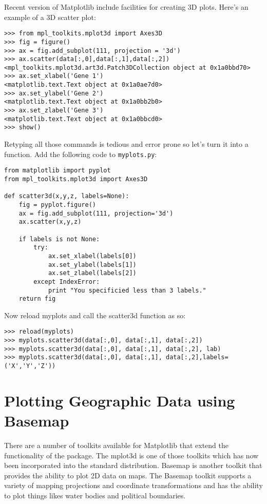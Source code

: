 Recent version of Matplotlib include facilities for creating 3D plots.
Here's an example of a 3D scatter plot:

\begin{lstlisting}
>>> from mpl_toolkits.mplot3d import Axes3D
>>> fig = figure()
>>> ax = fig.add_subplot(111, projection = '3d')
>>> ax.scatter(data[:,0],data[:,1],data[:,2])
<mpl_toolkits.mplot3d.art3d.Patch3DCollection object at 0x1a0bbd70>
>>> ax.set_xlabel('Gene 1')
<matplotlib.text.Text object at 0x1a0ae7d0>
>>> ax.set_ylabel('Gene 2')
<matplotlib.text.Text object at 0x1a0bb2b0>
>>> ax.set_zlabel('Gene 3')
<matplotlib.text.Text object at 0x1a0bbcd0>
>>> show()
\end{lstlisting}
Retyping all those commands is tedious and error prone so let's turn it
into a function. Add the following code to \lstinline!myplots.py!:

\begin{lstlisting}
from matplotlib import pyplot
from mpl_toolkits.mplot3d import Axes3D

def scatter3d(x,y,z, labels=None):
    fig = pyplot.figure()
    ax = fig.add_subplot(111, projection='3d')
    ax.scatter(x,y,z)

    if labels is not None:
        try:
            ax.set_xlabel(labels[0])
            ax.set_ylabel(labels[1])
            ax.set_zlabel(labels[2])
        except IndexError:
            print "You specificied less than 3 labels."
    return fig
\end{lstlisting}
Now reload myplots and call the scatter3d function as so:

\begin{lstlisting}
>>> reload(myplots)
>>> myplots.scatter3d(data[:,0], data[:,1], data[:,2])
>>> myplots.scatter3d(data[:,0], data[:,1], data[:,2], lab)
>>> myplots.scatter3d(data[:,0], data[:,1], data[:,2],labels=('X','Y','Z'))
\end{lstlisting}
\section{Plotting Geographic Data using Basemap}

There are a number of toolkits available for Matplotlib that extend the
functionality of the package. The mplot3d is one of those toolkits which
has now been incorporated into the standard distribution. Basemap is
another toolkit that provides the ability to plot 2D data on maps. The
Basemap toolkit supports a variety of mapping projections and coordinate
transformations and has the ability to plot things likes water bodies
and political boundaries.

